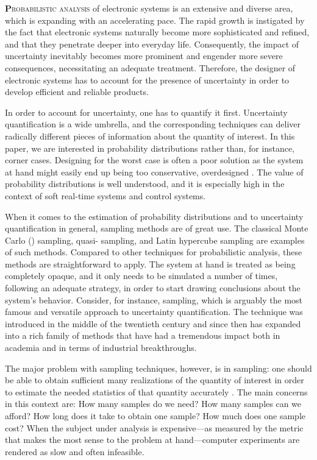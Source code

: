 \lettrine[findent=0.4em, nindent=0em]{\textbf{P}}{robabilistic analysis} of
electronic systems is an extensive and diverse area, which is expanding with an
accelerating pace. The rapid growth is instigated by the fact that electronic
systems naturally become more sophisticated and refined, and that they penetrate
deeper into everyday life. Consequently, the impact of uncertainty inevitably
becomes more prominent and engender more severe consequences, necessitating an
adequate treatment. Therefore, the designer of electronic systems has to account
for the presence of uncertainty in order to develop efficient and reliable
products.

In order to account for uncertainty, one has to quantify it first. Uncertainty
quantification is a wide umbrella, and the corresponding techniques can deliver
radically different pieces of information about the quantity of interest. In
this paper, we are interested in probability distributions rather than, for
instance, corner cases. Designing for the worst case is often a poor solution as
the system at hand might easily end up being too conservative, overdesigned
\cite{quinton2012}. The value of probability distributions is well understood,
and it is especially high in the context of soft real-time systems and control
systems.

When it comes to the estimation of probability distributions and to uncertainty
quantification in general, sampling methods are of great use. The classical
Monte Carlo () sampling, quasi- sampling, and Latin hypercube
sampling are examples of such methods. Compared to other techniques for
probabilistic analysis, these methods are straightforward to apply. The system
at hand is treated as being completely opaque, and it only needs to be simulated
a number of times, following an adequate strategy, in order to start drawing
conclusions about the system's behavior. Consider, for instance, 
sampling, which is arguably the most famous and versatile approach to
uncertainty quantification. The technique was introduced in the middle of the
twentieth century and since then has expanded into a rich family of methods that
have had a tremendous impact both in academia and in terms of industrial
breakthroughs.

The major problem with sampling techniques, however, is in sampling: one should
be able to obtain sufficient many realizations of the quantity of interest in
order to estimate the needed statistics of that quantity accurately
\cite{diaz-emparanza2002}. The main concerns in this context are: How many
samples do we need? How many samples can we afford? How long does it take to
obtain one sample? How much does one sample cost? When the subject under
analysis is expensive---as measured by the metric that makes the most sense to
the problem at hand---computer experiments are rendered as slow and often
infeasible.

